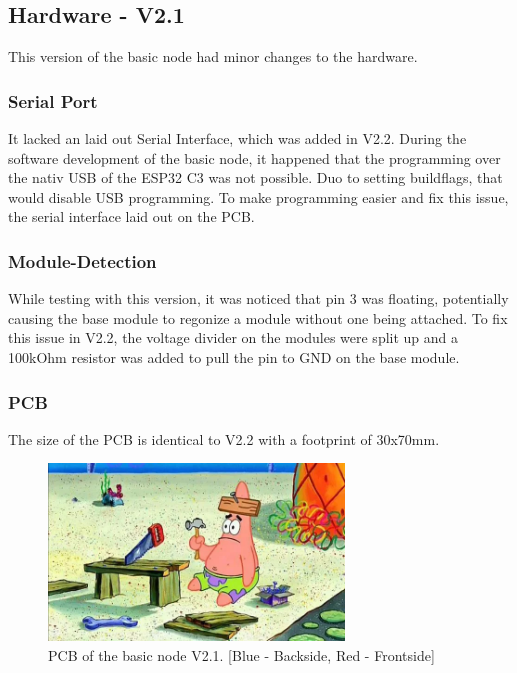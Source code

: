 \subsection{Hardware - V2.1}

    This version of the basic node had minor changes to the hardware. 

    \subsubsection{Serial Port}

        It lacked an laid out Serial Interface, which was added in V2.2.
        During the software development of the basic node, it happened that the 
        programming over the nativ USB of the ESP32 C3 was not possible. Duo to 
        setting buildflags, that would disable USB programming. To make programming
        easier and fix this issue, the serial interface laid out on the PCB. 


    \subsubsection{Module-Detection}
        While testing with this version, it was noticed that pin 3 was floating,
        potentially causing the base module to regonize a module without one being attached.
        To fix this issue in V2.2, the voltage divider on the modules were split up and
        a 100kOhm resistor was added to pull the pin to GND on the base module.

    \subsubsection{PCB}
        The size of the PCB is identical to V2.2 with a footprint of 30x70mm. 

    \begin{figure}[H]
        \centering
        \includegraphics[width=0.7\textwidth]{assets/HW/TBD.png}
        \caption{PCB of the basic node V2.1. [Blue - Backside, Red - Frontside]}
    \end{figure}


